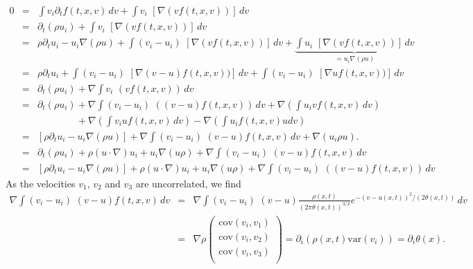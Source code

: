 \begin{eqnarray*}
0 & = & \int v_i \partial_t f(t,x,v)\, dv + \int v_i\,\,\left[\nabla (v f(t,x,v))\right]\, dv \\
& = & \partial_t(\rho u_i) + \int v_i\,\,\left[\nabla (v f(t,x,v))\right]\, dv \\
& = & \rho \partial_t u_i - u_i \nabla(\rho u)+ \int (v_i-u_i)\,\,\left[\nabla (v f(t,x,v))\right]\, dv +\underbrace{ \int u_i\,\,\left[\nabla (v f(t,x,v))\right]\, dv}_{=u_i\nabla(\rho u)} \\
& = & \rho \partial_t u_i + \int (v_i-u_i)\,\,\left[\nabla (v-u) f(t,x,v))\right]\, dv  + \int (v_i-u_i)\,\,\left[\nabla u f(t,x,v))\right]\, dv \\
& = & \partial_t(\rho u_i) + \nabla \int v_i\,\,(v f(t,x,v))\, dv \\
& = & \partial_t(\rho u_i) + \nabla \int (v_i-u_i)\,\,((v-u) f(t,x,v))\, dv +\nabla\left( \int u_i v f(t,x,v)\, dv\right) \\
&&\qquad\qquad+ \nabla \left( \int v_i u f(t,x,v)\, dv \right)- \nabla \left(\int u_i f(t,x,v) u  dv \right) \\
& = & [\rho \partial_t u_i  - u_i \nabla(\rho u)] + \nabla \int (v_i-u_i)\,\,(v-u) f(t,x,v)\, dv +\nabla(  u_i \rho u).\\
& = & \partial_t(\rho u_i) + \rho (u\cdot \nabla) u_i + u_i \nabla (u\rho) + \nabla \int (v_i-u_i)\,\,(v-u) f(t,x,v)\, dv\\
& = &[\rho \partial_t u_i  - u_i \nabla(\rho u)]+ \rho (u\cdot \nabla) u_i + u_i \nabla (u\rho) + \nabla \int (v_i-u_i)\,\,((v-u) f(t,x,v))\, dv
\end{eqnarray*}
As the velocities $v_1$, $v_2$ and $v_3$ are uncorrelated, we find 
\begin{eqnarray*}
\nabla \int (v_i-u_i)\,\,(v-u) f(t,x,v)\, dv & = & 
\nabla \int (v_i-u_i)\,\,(v-u) 
 \frac{\rho(x,t)}{(2\pi\theta(x,t))^{3/2}} e^{-(v-u(x,t))^2/(2\theta(x,t))}\, dv\\
 & = & 
  \nabla \rho \left(\begin{array}{c}
\mbox{cov}(v_i, v_1)\\
\mbox{cov}(v_i, v_2)\\
\mbox{cov}(v_i, v_3)\\
\end{array}\right)
= \partial_i(\rho(x,t)\mbox{var}(v_i)) = \partial_i\theta(x).
\end{eqnarray*}
